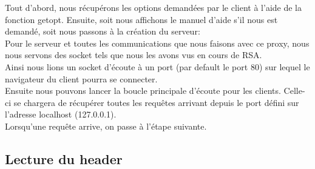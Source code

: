 \documentclass{scrreprt}
\begin{document}
Tout d'abord, nous récupérons les options demandées par le client à l'aide de la fonction getopt. Ensuite, soit nous affichons le manuel d'aide s'il nous est demandé, soit nous passons à la création du serveur:\\
Pour le serveur et toutes les communications que nous faisons avec ce proxy, nous nous servons des socket tels que nous les avons vus en cours de RSA.\\
Ainsi nous lions un socket d'écoute à un port (par default le port 80) sur lequel le navigateur du client pourra se connecter.\\
Ensuite nous pouvons lancer la boucle principale d'écoute pour les clients. Celle-ci se chargera de récupérer toutes les requêtes arrivant depuis le port défini sur l'adresse localhost (127.0.0.1).\\
Lorsqu'une requête arrive, on passe à l'étape suivante.
\subsection{Lecture du header}
\end{document}
